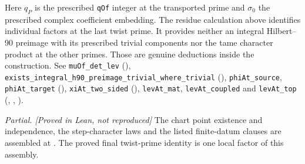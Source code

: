 \begin{enumerate}
Here \(q_P\) is the prescribed \nolinkurl{qOf} integer at the transported prime and \(\sigma_0\) the prescribed complex coefficient embedding. The residue calculation above identifies individual factors at the last twist prime. It provides neither an integral Hilbert--90 preimage with its prescribed trivial components nor the tame character product at the other primes. Those are genuine deductions inside the construction. See \nolinkurl{muOf_det_lev} (), \nolinkurl{exists_integral_h90_preimage_trivial_where_trivial} (), \nolinkurl{phiAt_source}, \nolinkurl{phiAt_target} (), \nolinkurl{xiAt_two_sided} (), \nolinkurl{levAt_mat}, \nolinkurl{levAt_coupled} and \nolinkurl{levAt_top} (, , ).
\end{enumerate}
\emph{Partial. [Proved in Lean, not reproduced]} The chart point existence and independence, the step-character laws and the listed finite-datum clauses are assembled at . The proved final twist-prime identity is one local factor of this assembly.

